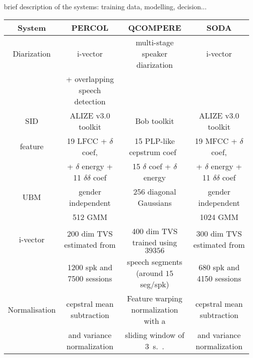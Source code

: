 brief description of the systems: training data, modelling, decision...

\begin{table*}[t]
  \centering
  \begin{tabular}{|c|c|c|c|}
    \hline
    System          & PERCOL                                        & QCOMPERE                                        & SODA      \\
    \hline    
    Diarization     & i-vector \cite{charlet2013}                   &  multi-stage speaker diarization \cite{Barras2006} &  i-vector \cite{dupuy2014}         \\
                    & + overlapping speech detection                &                                                 &           \\
    \hline    
    SID             & ALIZE v3.0 toolkit \cite{larcher2013}         & Bob toolkit \cite{bob2012}                      &  ALIZE v3.0 toolkit \cite{larcher2013}  \\
    \hline    
    feature         & 19 LFCC + $\delta$ coef,                      & 15 PLP-like cepstrum coef~\cite{Hermansky1990}  &  19 MFCC + $\delta$ coef,         \\
                    & + $\delta$ energy + 11 $\delta$$\delta$ coef  & 15 $\delta$ coef + $\delta$ energy              &  + $\delta$ energy + 11 $\delta$$\delta$ coef  \\
    \hline    
    UBM             & gender independent                            & 256 diagonal Gaussians                          &  gender independent         \\
                    & 512 GMM                                       &                                                 &  1024 GMM         \\
    \hline    
    i-vector        & 200 dim TVS estimated from                    & 400 dim TVS trained using $39356$               &  300 dim TVS estimated from         \\
                    & 1200 spk and 7500 sessions                    & speech segments (around $15$ seg/spk)           &  680 spk and 4150 sessions         \\
    \hline    
    Normalisation   & cepstral mean subtraction                     & Feature warping normalization with a            &  cepstral mean subtraction         \\
                    & and variance normalization                    & sliding window of $3$~s.~\cite{Pelecanos2001}.  &   and variance normalization        \\

\end{tabular}
\end{table*}
